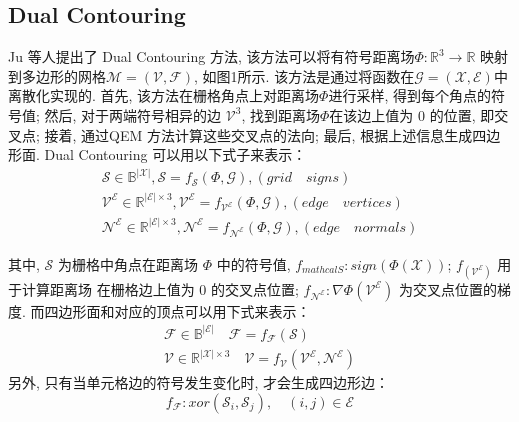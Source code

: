 \subsection{Dual Contouring}
Ju 等人\cite{ju2002dual}提出了 Dual Contouring 方法, 该方法可以将有符号距离场$\Phi:\mathbb{R}^3\rightarrow \mathbb{R}$ 映射到多边形的网格$\mathcal{M=(V,F)}$, 如图1所示. 该方法是通过将函数在$\mathcal{G=(X,E)}$中离散化实现的. 首先, 该方法在栅格角点上对距离场$\Phi$进行采样, 得到每个角点的符号值; 然后, 对于两端符号相异的边 $\mathcal{V}^3$, 找到距离场$\Phi$在该边上值为 0 的位置, 即交叉点; 接着, 通过QEM 方法计算这些交叉点的法向; 最后, 根据上述信息生成四边形面. Dual Contouring 可以用以下式子来表示：\\
\begin{align}\label{a}
\mathcal{S}\in \mathbb{B}^{|\mathcal{X}|},  \mathcal{S}=f_{\mathcal{S}}(\Phi,\mathcal{G}),  (grid \quad signs) \\
\mathcal{V}^\mathcal{E}\in\mathbb{R}^{|\mathcal{E}|\times 3}, \mathcal{V}^\mathcal{E}=f_{\mathcal{V}^\mathcal{E}}(\Phi,\mathcal{G}), (edge\quad vertices)\\
\mathcal{N}^\mathcal{E}\in\mathbb{R}^{|\mathcal{E}|\times 3},
\mathcal{N}^\mathcal{E}=f_{\mathcal{N}^\mathcal{E}}(\Phi,\mathcal{G}), (edge\quad normals)
\end{align}


其中, $\mathcal{S}$ 为栅格中角点在距离场 $\Phi$ 中的符号值, $ f_{mathcal{S}}: sign(\Phi(\mathcal{X}))$; $f_(\mathcal{V}^\mathcal{E})$ 用于计算距离场 在栅格边上值为 0 的交叉点位置; $f_\mathcal{N^E}:\nabla \Phi(\mathcal{V^E})$  为交叉点位置的梯度. 而四边形面和对应的顶点可以用下式来表示：
\begin{align}
    \mathcal{F}\in \mathbb{B}^{|\mathcal{E}|} \quad \mathcal{F}=f_{\mathcal{F}}(\mathcal{S}) \\
    \mathcal{V} \in \mathbb{R}^{|\mathcal{X}| \times 3} \quad \mathcal{V}=f_{\mathcal{V}}(\mathcal{V}^{\mathcal{E}}, \mathcal{N}^{\mathcal{E}})
\end{align}
另外, 只有当单元格边的符号发生变化时, 才会生成四边形边：
\begin{equation}
    f_{\mathcal{F}}:xor(\mathcal{S}_i, \mathcal{S}_j), \quad (i, j)\in \mathcal{E}
\end{equation}




